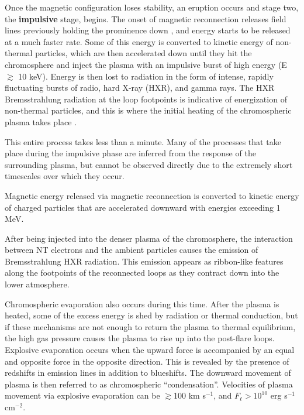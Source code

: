 Once the magnetic configuration loses stability, an eruption occurs
and stage two, the \textbf{impulsive} stage, begins. The onset of
magnetic reconnection releases field lines previously holding the
prominence down \citep{Priest2017}, and energy starts to be released
at a much faster rate.
Some of this energy is converted to kinetic energy of
non-thermal particles, which are then accelerated down until they hit the
chromosphere and inject the plasma with an impulsive burst of high energy
(E $\gtrsim$ 10 keV).
Energy is then lost to radiation in the form of
intense, rapidly fluctuating bursts of radio, hard X-ray (HXR),
and gamma rays.
The HXR Bremsstrahlung radiation at the loop footpoints is indicative
of energization of non-thermal particles, and this is
where the initial heating of the chromospheric plasma takes place
\citep{Hoyng1981, Fletcher2013b}.

This entire process takes less than a minute.
Many of the processes that take place during the impulsive phase
are inferred from the response of the surrounding plasma,
but cannot be observed directly due to the extremely short timescales
over which they occur.

Magnetic energy released via magnetic reconnection is converted to
kinetic energy of charged particles that are accelerated downward
with energies exceeding 1 MeV.

After being injected into the denser plasma of the chromosphere,
the interaction between NT electrons and the ambient particles causes
the emission of Bremsstrahlung HXR radiation.
This emission appears as ribbon-like features along the footpoints
of the reconnected loops as they contract down into the lower atmosphere.

Chromospheric evaporation also occurs during this time.
After the plasma is heated, some of the excess energy is shed by
radiation or thermal conduction, but if these mechanisms are not enough
to return the plasma to thermal equilibrium, the high gas pressure causes
the plasma to rise up into the post-flare loops.
Explosive evaporation occurs when the upward force is accompanied by
an equal and opposite force in the opposite direction.
This is revealed by the presence of redshifts in emission lines in
addition to blueshifts. The downward movement of plasma is then
referred to as chromospheric ``condensation''.
Velocities of plasma movement via explosive evaporation can be
$\gtrsim$100 km s$^{-1}$, and $F_{\ell} > 10^{10}$ erg s$^{-1}$ cm$^{-2}$.

